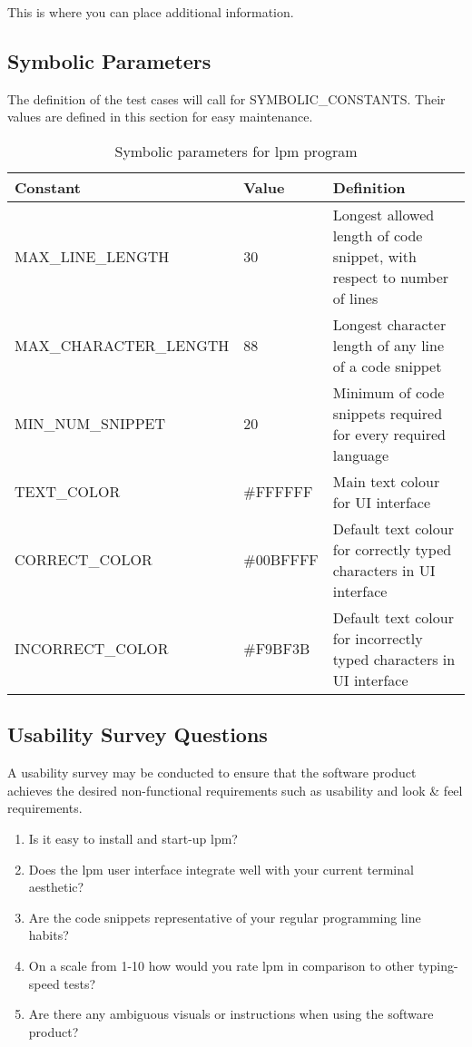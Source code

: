 \documentclass[12pt, titlepage]{article}
\begin{document}
This is where you can place additional information.

\subsection{Symbolic Parameters}

The definition of the test cases will call for SYMBOLIC\_CONSTANTS.
Their values are defined in this section for easy maintenance.

\begin{table}[!hbtp]
    \centering
    \begin{tabular}{|p{6cm}|p{2cm}|p{7cm}|}
    \hline
    Constant & Value & Definition \\
    \hline
    MAX\_LINE\_LENGTH & 30 & Longest allowed length of code snippet, with respect to number of lines \\
    \hline
    MAX\_CHARACTER\_LENGTH & 88 & Longest character length of any line of a code snippet \\
    \hline
    MIN\_NUM\_SNIPPET & 20 & Minimum of code snippets required for every required language \\
    \hline
    TEXT\_COLOR & \#FFFFFF & Main text colour for UI interface \\
    \hline
    CORRECT\_COLOR & \#00BFFFF & Default text colour for correctly typed characters in UI interface \\
    \hline
    INCORRECT\_COLOR & \#F9BF3B & Default text colour for incorrectly typed characters in UI interface \\
    \hline
    \end{tabular}

    \caption{Symbolic parameters for lpm program}
    \label{tab:my_label}
\end{table}

\subsection{Usability Survey Questions}

A usability survey may be conducted to ensure that the software product achieves the desired non-functional requirements such as usability and look \& feel requirements.
\begin{enumerate}
    \item Is it easy to install and start-up lpm?
    \item Does the lpm user interface integrate well with your current terminal aesthetic?
    \item Are the code snippets representative of your regular programming line habits?
    \item On a scale from 1-10 how would you rate lpm in comparison to other typing-speed tests?
    \item Are there any ambiguous visuals or instructions when using the software product?
\end{enumerate}
\end{document}
